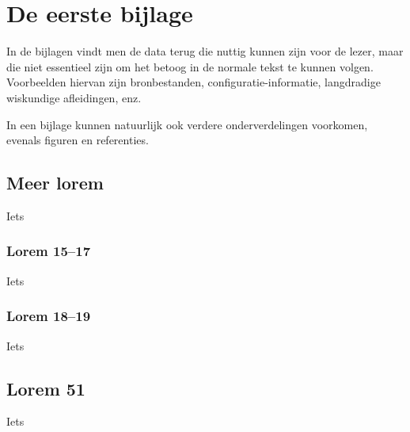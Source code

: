 \chapter{De eerste bijlage}
\label{app:A}
In de bijlagen vindt men de data terug die nuttig kunnen zijn voor de
lezer, maar die niet essentieel zijn om het betoog in de normale tekst te
kunnen volgen. Voorbeelden hiervan zijn bronbestanden,
configuratie-informatie, langdradige wiskundige afleidingen, enz.

In een bijlage kunnen natuurlijk ook verdere onderverdelingen voorkomen,
evenals figuren en referenties\cite{h2g2}.

\section{Meer lorem}
Iets

\subsection{Lorem 15--17}
Iets

\subsection{Lorem 18--19}
Iets

\section{Lorem 51}
Iets


